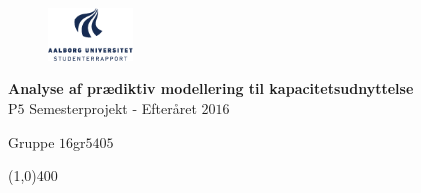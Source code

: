 \clearpage
\thispagestyle{empty}

\begin{figure}[H]
	\raggedleft
		\includegraphics[width=0.2\textwidth]{figures/aaulogo-da.png}
\end{figure} 
\vspace*{\fill} 
\begin{center}	
\begin{Huge}
\textbf{Analyse af prædiktiv modellering til kapacitetsudnyttelse}\\
\vspace{5 mm}
P$5$ Semesterprojekt - Efteråret $2016$\\
\vspace{3 mm}
\end{Huge}
{\Large Gruppe $16$gr$5405$}
\end{center}
\vspace*{\fill}

\begin{center}
\line(1,0){400}
\end{center}
